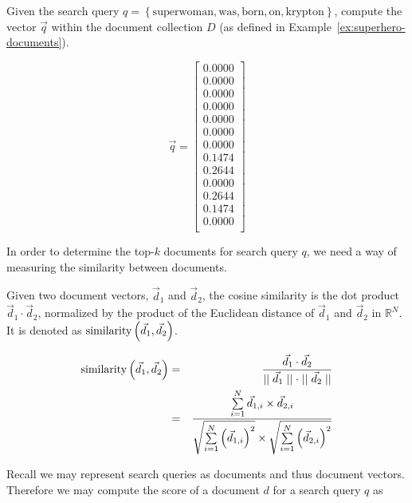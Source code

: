 		\begin{ex}
			Given the search query $q = \left\{ \mathrm{superwoman}, \mathrm{was}, \mathrm{born}, \mathrm{on}, \mathrm{krypton} \right\}$, compute the vector $\vec{q}$ within the document collection $D$ (as defined in Example~\ref{ex:superhero-documents}).
			
			$$
			\vec{q} = 
				\left[
					\begin{array}{c}
						0.0000 \\
						0.0000 \\
						0.0000 \\
						0.0000 \\
						0.0000 \\
						0.0000 \\
						0.0000 \\
						0.1474 \\
						0.2644 \\
						0.0000 \\
						0.2644 \\
						0.1474 \\
						0.0000 \\
					\end{array}
				\right]
			$$
		\end{ex}
		
		In order to determine the top-$k$ documents for search query $q$, we need a way of measuring the similarity between documents.
		
		\begin{defn}
			Given two document vectors, $\vec{d}_1$ and $\vec{d}_2$, the cosine similarity is the dot product $\vec{d}_1 \cdot \vec{d}_2$, normalized by the product of the Euclidean distance of $\vec{d}_1$ and $\vec{d}_2$ in $\mathbb{R}^N$.  It is denoted as $\operatorname{similarity}\left(\vec{d}_1, \vec{d}_2\right)$.
			
			\begin{eqnarray}
				\operatorname{similarity}\left(\vec{d}_1, \vec{d}_2\right) &=& \frac{\vec{d}_1 \cdot \vec{d}_2}{\mid\mid \vec{d}_1 \mid\mid \cdot \mid\mid \vec{d}_2 \mid\mid} \\
				 &=& \frac{\sum\limits_{i=1}^{N} \vec{d}_{1, i} \times \vec{d}_{2, i}}{\sqrt{\sum\limits_{i=1}^{N} \left(\vec{d}_{1, i}\right)^2} \times \sqrt{\sum\limits_{i=1}^{N} \left(\vec{d}_{2, i}\right)^2}}
			\end{eqnarray}
		\end{defn}
		
		Recall we may represent search queries as documents and thus document vectors.  Therefore we may compute the score of a document $d$ for a search query $q$ as
		
